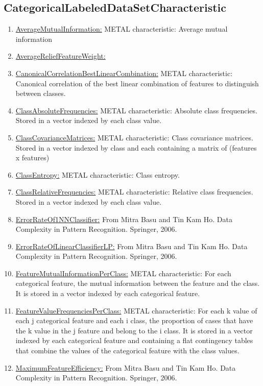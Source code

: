 \documentclass[a4paper,12pt, english]{article}
\begin{document}
\subsection{CategoricalLabeledDataSetCharacteristic}

				\begin{enumerate}
				\item \underline{AverageMutualInformation:} METAL characteristic: Average mutual information 
				\item \underline{AverageReliefFeatureWeight:}
				\item \underline{CanonicalCorrelationBestLinearCombination:} METAL characteristic: Canonical correlation of the best linear combination of features to distinguish between classes.
				\item \underline{ClassAbsoluteFrequencies:} METAL characteristic: Absolute class frequencies. Stored in a vector indexed by each class value.
				\item \underline{ClassCovarianceMatrices:} METAL characteristic: Class covariance matrices. Stored in a vector indexed by class and each containing a matrix of (features x features)
				\item \underline{ClassEntropy:}  METAL characteristic: Class entropy.
				\item \underline{ClassRelativeFrequencies:} METAL characteristic: Relative class frequencies. Stored in a vector indexed by each class value.
				\item \underline{ErrorRateOf1NNClassifier:}  From Mitra Basu and Tin Kam Ho. Data Complexity in Pattern Recognition. Springer, 2006.
				\item \underline{ErrorRateOfLinearClassifierLP:} From Mitra Basu and Tin Kam Ho. Data Complexity in Pattern Recognition. Springer, 2006.
				\item \underline{FeatureMutualInformationPerClass:} METAL characteristic: For each categorical feature, the mutual information between the feature and the class. It is stored in a vector indexed by each categorical feature.
				\item \underline{FeatureValueFrequenciesPerClass:} METAL characteristic: For each k value of each j categorical feature and each i class, the proportion of cases that have the k value in the j feature and belong to the i class. It is stored in a vector indexed by each categorical feature and containing a flat contingency tables that combine the values of the categorical feature with the class values. 
				\item \underline{MaximumFeatureEfficiency:} From Mitra Basu and Tin Kam Ho. Data Complexity in Pattern Recognition. Springer, 2006.

\end{enumerate}
\end{document}
